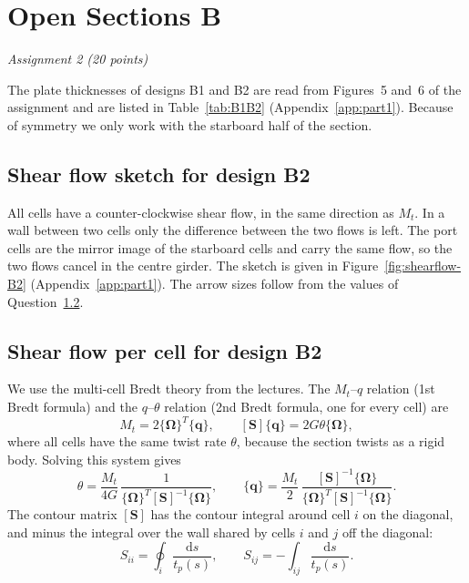 \chapter{Open Sections B}
\label{ch:assignment2}

\begingroup\itshape Assignment 2 (20 points)\endgroup

\bigskip
The plate thicknesses of designs B1 and B2 are read from Figures~5 and~6 of the assignment and are listed in Table~\ref{tab:B1B2} (Appendix~\ref{app:part1}). Because of symmetry we only work with the starboard half of the section.

\section{Shear flow sketch for design B2}
\label{sec:a2-1}

All cells have a counter-clockwise shear flow, in the same direction as $M_t$. In a wall between two cells only the difference between the two flows is left. The port cells are the mirror image of the starboard cells and carry the same flow, so the two flows cancel in the centre girder. The sketch is given in Figure~\ref{fig:shearflow-B2} (Appendix~\ref{app:part1}). The arrow sizes follow from the values of Question~\ref{sec:a2-2}.

\section{Shear flow per cell for design B2}
\label{sec:a2-2}

We use the multi-cell Bredt theory from the lectures. The $M_t$--$q$ relation (1st Bredt formula) and the $q$--$\theta$ relation (2nd Bredt formula, one for every cell) are
\begin{equation}
  M_t = 2\{\boldsymbol{\Omega}\}^T\{\mathbf{q}\}, \qquad
  [\mathbf{S}]\{\mathbf{q}\} = 2G\theta\{\boldsymbol{\Omega}\},
  \label{eq:B2_bredt}
\end{equation}
where all cells have the same twist rate $\theta$, because the section twists as a rigid body. Solving this system gives
\begin{equation}
  \theta = \frac{M_t}{4G}\,\frac{1}{\{\boldsymbol{\Omega}\}^T[\mathbf{S}]^{-1}\{\boldsymbol{\Omega}\}},
  \qquad
  \{\mathbf{q}\} = \frac{M_t}{2}\,\frac{[\mathbf{S}]^{-1}\{\boldsymbol{\Omega}\}}{\{\boldsymbol{\Omega}\}^T[\mathbf{S}]^{-1}\{\boldsymbol{\Omega}\}} .
  \label{eq:B2_solution}
\end{equation}
The contour matrix $[\mathbf{S}]$ has the contour integral around cell $i$ on the diagonal, and minus the integral over the wall shared by cells $i$ and $j$ off the diagonal:
\begin{equation}
  S_{ii} = \oint_i \frac{\mathrm{d}s}{t_p(s)}, \qquad
  S_{ij} = -\int_{ij} \frac{\mathrm{d}s}{t_p(s)} .
\end{equation}

